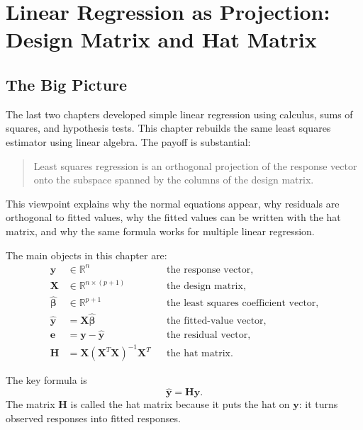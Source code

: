 \chapter{Linear Regression as Projection: Design Matrix and Hat Matrix}
\label{chap:linear-regression-projection-design-matrix-hat-matrix}

\section{The Big Picture}

The last two chapters developed simple linear regression using calculus, sums of squares, and hypothesis tests.  This chapter rebuilds the same least squares estimator using linear algebra.  The payoff is substantial:
\begin{quote}
  Least squares regression is an orthogonal projection of the response vector onto the subspace spanned by the columns of the design matrix.
\end{quote}

This viewpoint explains why the normal equations appear, why residuals are orthogonal to fitted values, why the fitted values can be written with the hat matrix, and why the same formula works for multiple linear regression.

The main objects in this chapter are:
\begin{align}
  \mathbf{y} &\in \mathbb{R}^n &&\text{the response vector}, \\
  \mathbf{X} &\in \mathbb{R}^{n\times (p+1)} &&\text{the design matrix}, \\
  \widehat{\boldsymbol{\beta}} &\in \mathbb{R}^{p+1} &&\text{the least squares coefficient vector}, \\
  \widehat{\mathbf{y}} &= \mathbf{X}\widehat{\boldsymbol{\beta}} &&\text{the fitted-value vector}, \\
  \mathbf{e} &= \mathbf{y}-\widehat{\mathbf{y}} &&\text{the residual vector}, \\
  \mathbf{H} &= \mathbf{X}(\mathbf{X}^T\mathbf{X})^{-1}\mathbf{X}^T &&\text{the hat matrix}.
\end{align}

The key formula is
\begin{equation}
  \boxed{\widehat{\mathbf{y}}=\mathbf{H}\mathbf{y}.}
\end{equation}
The matrix \(\mathbf{H}\) is called the hat matrix because it puts the hat on \(\mathbf{y}\): it turns observed responses into fitted responses.

